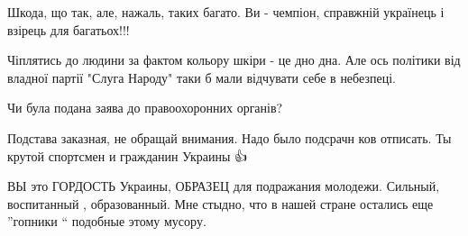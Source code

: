 \begin{itemize}
 
Шкода, що так, але, нажаль, таких багато. Ви - чемпіон, справжній українець і взірець для багатьох!!!

 
Чіплятись до людини за фактом кольору шкіри - це дно дна.
Але ось політики від владної партії "Слуга Народу" таки б мали відчувати себе в небезпеці.

 
Чи була подана заява до правоохоронних органів?

 
Подстава заказная, не обращай внимания. Надо было подсрачн ков отписать. Ты крутой спортсмен и гражданин Украины 👍

 
ВЫ это ГОРДОСТЬ Украины, ОБРАЗЕЦ для подражания молодежи. Сильный,
воспитанный , образованный.
Мне стыдно, что в нашей стране остались еще ”гопники “ подобные этому мусору.

 

\end{itemize}
